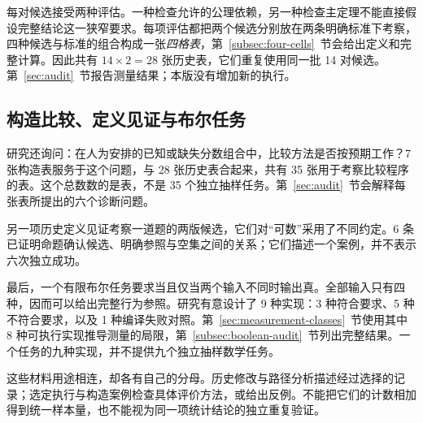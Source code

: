 每对候选接受两种评估。一种检查允许的公理依赖，另一种检查主定理不能直接假设完整结论这一狭窄要求。每项评估都把两个候选分别放在两条明确标准下考察，四种候选与标准的组合构成一张\emph{四格表}，第~\ref{subsec:four-cells}~节会给出定义和完整计算。因此共有 $14\times2=28$ 张历史表，它们重复使用同一批 14 对候选。第~\ref{sec:audit}~节报告测量结果；本版没有增加新的执行。

\subsection{构造比较、定义见证与布尔任务}
\label{subsec:constructed-materials}
研究还询问：在人为安排的已知或缺失分数组合中，比较方法是否按预期工作？7 张构造表服务于这个问题，与 28 张历史表合起来，共有 35 张用于考察比较程序的表。这个总数数的是表，不是 35 个独立抽样任务。第~\ref{sec:audit}~节会解释每张表所提出的六个诊断问题。

另一项历史定义见证考察一道题的两版候选，它们对“可数”采用了不同约定。6 条已证明命题确认候选、明确参照与空集之间的关系；它们描述一个案例，并不表示六次独立成功。

最后，一个有限布尔任务要求当且仅当两个输入不同时输出真。全部输入只有四种，因而可以给出完整行为参照。研究有意设计了 9 种实现：3 种符合要求、5 种不符合要求，以及 1 种编译失败对照。第~\ref{sec:measurement-classes}~节使用其中 8 种可执行实现推导测量的局限，第~\ref{subsec:boolean-audit}~节列出完整结果。一个任务的九种实现，并不提供九个独立抽样数学任务。

这些材料用途相连，却各有自己的分母。历史修改与路径分析描述经过选择的记录；选定执行与构造案例检查具体评价方法，或给出反例。不能把它们的计数相加得到统一样本量，也不能视为同一项统计结论的独立重复验证。
